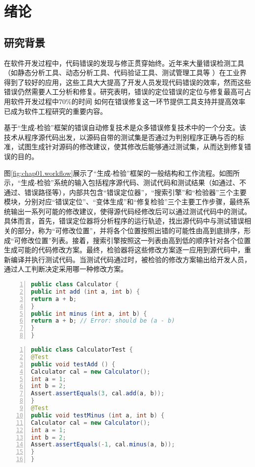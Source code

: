 \chapter{绪论}
\label{cha:intro}

\section{研究背景}%
在软件开发过程中，代码错误的发现与修正贯穿始终。近年来大量错误检测工具（如静态分析工具、动态分析工具、代码验证工具、测试管理工具等%
）在工业界得到了较好的应用，这些工具大大提高了开发人员发现代码错误的效率，然而这些错误仍然需要人工分析和修复。研究表明，错误的定位错误的定位与修复最高可占用软件开发过程中70\%的时间%
如何在错误修复这一环节提供工具支持并提高效率已成为软件工程研究的重要内容。

基于“生成-检验”框架的错误自动修复技术是众多错误修复技术中的一个分支。该技术从程序源代码出发，以源码自带的测试集是否通过为判别程序正确与否的标准，试图生成针对源码的修改建议，使其修改后能够通过测试集，从而达到修复错误的目的。

图\ref{fig:chap01.workflow}展示了“生成-检验”框架的一般结构和工作流程。如图所示，“生成-检验”系统的输入包括程序源代码、测试代码和测试结果（如通过、不通过、错误路径等），内部共包含“错误定位器”，“搜索引擎”和“检验器”三个主要模块，分别对应“错误定位”、“变体生成”和“修复检验”三个主要工作步骤，最终系统输出一系列可能的修改建议，使得源代码经修改后可以通过测试代码中的测试。具体而言，首先，错误定位器将分析程序的运行轨迹，找出源代码中与测试错误相关的部分，称为“可修改位置”，并将各个位置按照出错的可能性由高到底排序，形成“可修改位置”列表。接着，搜索引擎按照这一列表由高到低的顺序针对各个位置生成可能的代码修改方案。最终，检验器将这些修改方案逐一应用到源代码中，重新编译并执行测试代码。当测试代码通过时，被检验的修改方案输出给开发人员，通过人工判断决定采用哪一种修改方案。

\begin{lstlisting}[caption=“生成-检验”框架应用示例,frame=single,language=Java,numbers=left]
public class Calculator {
public int add (int a, int b) {
return a + b;
}
public int minus (int a, int b) {
return a + b; // Error: should be (a - b)
}
}
\end{lstlisting}

\begin{lstlisting}[caption=“生成-检验”框架应用示例,frame=single,language=Java,numbers=left]
public class CalculatorTest {  
@Test
public void testAdd () {
Calculator cal = new Calculator();
int a = 1;
int b = 2;
Assert.assertEquals(3, cal.add(a, b));
}  
@Test
public void testMinus (int a, int b) {
Calculator cal = new Calculator();
int a = 1;
int b = 2;
Assert.assertEquals(-1, cal.minus(a, b));
}  
}
\end{lstlisting}

